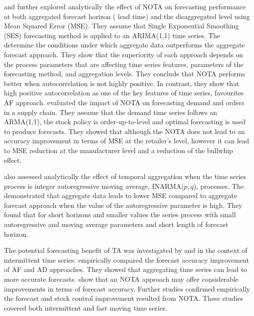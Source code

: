 \documentclass[]{elsarticle} %
\begin{document}
\citet{rostami2013demand} and \citet{rostami2014note} further explored
analytically the effect of NOTA on forecasting performance at both
aggregated forecast horizon ( lead time) and the disaggregated level
using Mean Squared Error (MSE). They assume that Single Exponential
Smoothing (SES) forecasting method is applied to an ARIMA(1,1) time
series. The determine the conditions under which aggregate data
outperforms the aggregate forecast approach. They show that the
superiority of each approach depends on the process parameters that are
affecting time series features, parameters of the forecasting method,
and aggregation levels. They conclude that NOTA performs better when
autocorrelation is not highly positive. In contrast, they show that high
positive autocorrelation as one of the key features of time series,
favourites AF approach. \citet{rostami2019impact} evaluated the impact
of NOTA on forecasting demand and orders in a supply chain. They assume
that the demand time series follows an ARMA(1,1), the stock policy is
order-up-to-level and optimal forecasting is used to produce forecasts.
They showed that although the NOTA does not lead to an accuracy
improvement in terms of MSE at the retailer's level, however it can lead
to MSE reduction at the manufacturer level and a reduction of the
bullwhip effect.

\citet{mohammadipour2012forecast} also assessed analytically the effect
of temporal aggregation when the time series process is integer
autoregressive moving average, INARMA(\(p,q\)), processes. The
demonstrated that aggregate data leads to lower MSE compared to
aggregate forecast approach when the value of the autoregressive
parameter is high. They found that for short horizons and smaller values
the series process with small autoregressive and moving average
parameters and short length of forecast horizon.

The potential forecasting benefit of TA was investigated by
\citet{willemain1994forecasting} and \citet{nikolopoulos2011aggregate}
in the context of intermittent time series.
\citet{willemain1994forecasting} empirically compared the forecast
accuracy improvement of AF and AD approaches. They showed that
aggregating time series can lead to more accurate forecasts.
\citet{nikolopoulos2011aggregate} show that an NOTA approach may offer
considerable improvements in terms of forecast accuracy. Further studies
\citep{babai2012impact, petropoulos2015forecast, kourentzes2014improving, spithourakis2011improving}
confirmed empirically the forecast and stock control improvement
resulted from NOTA. These studies covered both intermittent and fast
moving time series.
\end{document}
